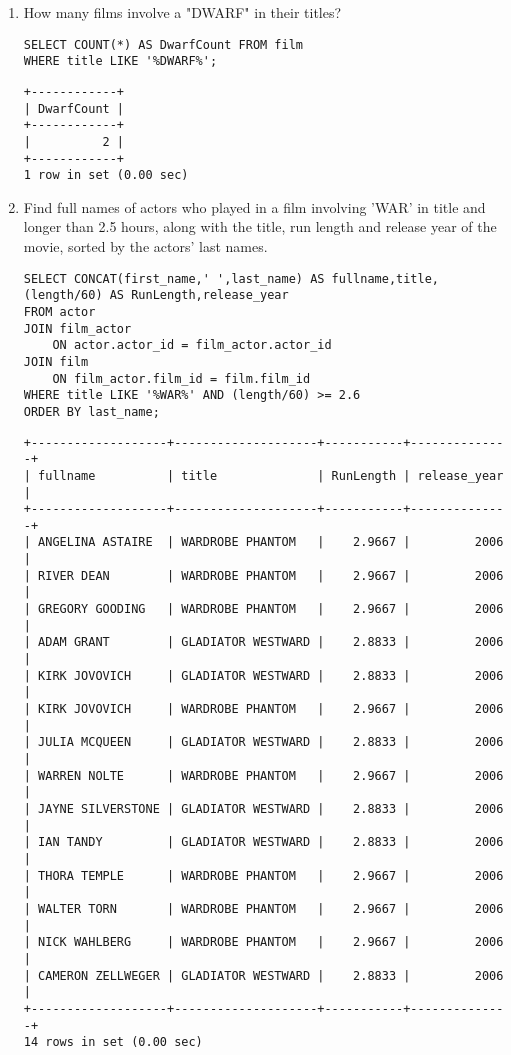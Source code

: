 \documentclass[]{article}
\begin{document}
\begin{enumerate}
\item How many films involve a "DWARF" in their titles?
\begin{verbatim}
SELECT COUNT(*) AS DwarfCount FROM film
WHERE title LIKE '%DWARF%';
\end{verbatim}
\begin{verbatim}
+------------+
| DwarfCount |
+------------+
|          2 |
+------------+
1 row in set (0.00 sec)
\end{verbatim}

\item Find full names of actors who played in a film involving ’WAR’ in title and longer than 2.5 hours, along with the title, run length and release year of the movie, sorted by the actors’ last names.
\begin{verbatim}
SELECT CONCAT(first_name,' ',last_name) AS fullname,title,(length/60) AS RunLength,release_year
FROM actor
JOIN film_actor
	ON actor.actor_id = film_actor.actor_id
JOIN film
	ON film_actor.film_id = film.film_id
WHERE title LIKE '%WAR%' AND (length/60) >= 2.6
ORDER BY last_name;
\end{verbatim}
\begin{verbatim}
+-------------------+--------------------+-----------+--------------+
| fullname          | title              | RunLength | release_year |
+-------------------+--------------------+-----------+--------------+
| ANGELINA ASTAIRE  | WARDROBE PHANTOM   |    2.9667 |         2006 |
| RIVER DEAN        | WARDROBE PHANTOM   |    2.9667 |         2006 |
| GREGORY GOODING   | WARDROBE PHANTOM   |    2.9667 |         2006 |
| ADAM GRANT        | GLADIATOR WESTWARD |    2.8833 |         2006 |
| KIRK JOVOVICH     | GLADIATOR WESTWARD |    2.8833 |         2006 |
| KIRK JOVOVICH     | WARDROBE PHANTOM   |    2.9667 |         2006 |
| JULIA MCQUEEN     | GLADIATOR WESTWARD |    2.8833 |         2006 |
| WARREN NOLTE      | WARDROBE PHANTOM   |    2.9667 |         2006 |
| JAYNE SILVERSTONE | GLADIATOR WESTWARD |    2.8833 |         2006 |
| IAN TANDY         | GLADIATOR WESTWARD |    2.8833 |         2006 |
| THORA TEMPLE      | WARDROBE PHANTOM   |    2.9667 |         2006 |
| WALTER TORN       | WARDROBE PHANTOM   |    2.9667 |         2006 |
| NICK WAHLBERG     | WARDROBE PHANTOM   |    2.9667 |         2006 |
| CAMERON ZELLWEGER | GLADIATOR WESTWARD |    2.8833 |         2006 |
+-------------------+--------------------+-----------+--------------+
14 rows in set (0.00 sec)
\end{verbatim}


\end{enumerate}
\end{document}
